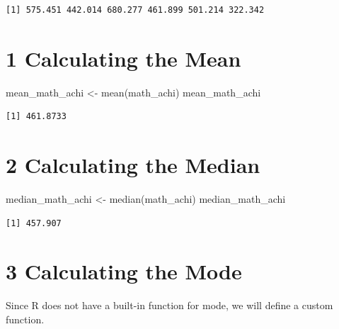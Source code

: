 \documentclass[
  letterpaper,
  DIV=11,
  numbers=noendperiod]{scrreprt}
\newenvironment{Shaded}{\begin{snugshade}}{\end{snugshade}}
\newcommand{\FunctionTok}[1]{\textcolor[rgb]{0.28,0.35,0.67}{#1}}
\newcommand{\NormalTok}[1]{\textcolor[rgb]{0.00,0.23,0.31}{#1}}
\newcommand{\OtherTok}[1]{\textcolor[rgb]{0.00,0.23,0.31}{#1}}
\begin{document}
\begin{verbatim}
[1] 575.451 442.014 680.277 461.899 501.214 322.342
\end{verbatim}

\section*{1 Calculating the Mean}\label{calculating-the-mean}


\begin{Shaded}
\begin{Highlighting}[]
\NormalTok{mean\_math\_achi }\OtherTok{\textless{}{-}} \FunctionTok{mean}\NormalTok{(math\_achi) }
\NormalTok{mean\_math\_achi }
\end{Highlighting}
\end{Shaded}

\begin{verbatim}
[1] 461.8733
\end{verbatim}

\section*{2 Calculating the Median}\label{calculating-the-median}


\begin{Shaded}
\begin{Highlighting}[]
\NormalTok{median\_math\_achi }\OtherTok{\textless{}{-}} \FunctionTok{median}\NormalTok{(math\_achi) }
\NormalTok{median\_math\_achi }
\end{Highlighting}
\end{Shaded}

\begin{verbatim}
[1] 457.907
\end{verbatim}

\section*{3 Calculating the Mode}\label{calculating-the-mode}


Since R does not have a built-in function for mode, we will define a
custom function.
\end{document}
